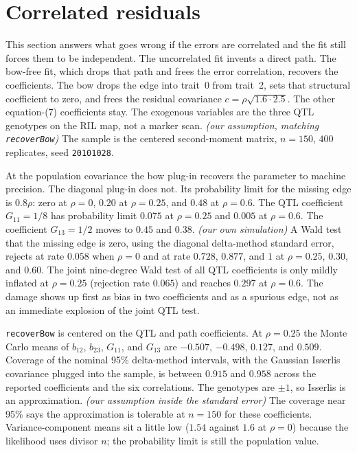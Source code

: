 \documentclass[11pt]{article}
\newcommand{\ev}[1]{\textup{\emph{(#1)}}}
\begin{document}
\section{Correlated residuals}

This section answers what goes wrong if the errors are correlated and the
fit still forces them to be independent. The uncorrelated fit invents a
direct path. The bow-free fit, which drops that path and frees the error
correlation, recovers the coefficients. The bow drops the edge into trait~0 from trait~2, sets that structural
coefficient to zero, and frees the residual covariance $c=\rho\sqrt{1.6\cdot 2.5}$.
The other equation-(7) coefficients stay. The exogenous variables are the
three QTL genotypes on the RIL map, not a marker scan.
\ev{our assumption, matching \texttt{recoverBow}}
The sample is the centered second-moment matrix, $n=150$, $400$ replicates,
seed \texttt{20101028}.

At the population covariance the bow plug-in recovers the parameter to
machine precision. The diagonal plug-in does not. Its probability limit for
the missing edge is $0.8\rho$: zero at $\rho=0$, $0.20$ at $\rho=0.25$, and
$0.48$ at $\rho=0.6$. The QTL coefficient $G_{11}=1/8$ has probability limit
$0.075$ at $\rho=0.25$ and $0.005$ at $\rho=0.6$. The coefficient $G_{13}=1/2$
moves to $0.45$ and $0.38$. \ev{our own simulation}
A Wald test that the missing edge is zero, using the diagonal delta-method
standard error, rejects at rate $0.058$ when $\rho=0$ and at rate $0.728$,
$0.877$, and $1$ at $\rho=0.25$, $0.30$, and $0.60$. The joint nine-degree
Wald test of all QTL coefficients is only mildly inflated at $\rho=0.25$
(rejection rate $0.065$) and reaches $0.297$ at $\rho=0.6$. The damage shows
up first as bias in two coefficients and as a spurious edge, not as an
immediate explosion of the joint QTL test.

\texttt{recoverBow} is centered on the QTL and path coefficients. At
$\rho=0.25$ the Monte Carlo means of $b_{12}$, $b_{23}$, $G_{11}$, and
$G_{13}$ are $-0.507$, $-0.498$, $0.127$, and $0.509$. Coverage of the
nominal 95\% delta-method intervals, with the Gaussian Isserlis covariance
plugged into the sample, is between $0.915$ and $0.958$ across the reported
coefficients and the six correlations. The genotypes are $\pm 1$, so
Isserlis is an approximation. \ev{our assumption inside the standard error}
The coverage near 95\% says the approximation is tolerable at $n=150$ for
these coefficients. Variance-component means sit a little low ($1.54$ against
$1.6$ at $\rho=0$) because the likelihood uses divisor $n$; the probability
limit is still the population value.
\end{document}
